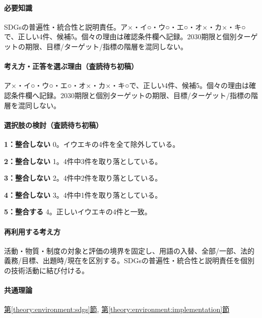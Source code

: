 \paragraph{必要知識} SDGsの普遍性・統合性と説明責任。ア×・イ○・ウ○・エ○・オ×・カ×・キ○で、正しい4件、候補5。個々の理由は確認条件欄へ記録。2030期限と個別ターゲットの期限、目標/ターゲット/指標の階層を混同しない。

\paragraph{考え方・正答を選ぶ理由（査読待ち初稿）} ア×・イ○・ウ○・エ○・オ×・カ×・キ○で、正しい4件、候補5。個々の理由は確認条件欄へ記録。2030期限と個別ターゲットの期限、目標/ターゲット/指標の階層を混同しない。

\paragraph{選択肢の検討（査読待ち初稿）}\mbox{}\par

\noindent\textbf{1：整合しない} 0。イウエキの4件を全て除外している。\par

\noindent\textbf{2：整合しない} 1。4件中3件を取り落としている。\par

\noindent\textbf{3：整合しない} 2。4件中2件を取り落としている。\par

\noindent\textbf{4：整合しない} 3。4件中1件を取り落としている。\par

\noindent\textbf{5：整合する} 4。正しいイウエキの4件と一致。\par

\paragraph{再利用する考え方} 活動・物質・制度の対象と評価の境界を固定し、用語の入替、全部/一部、法的義務/目標、出題時/現在を区別する。SDGsの普遍性・統合性と説明責任を個別の技術活動に結び付ける。

\paragraph{共通理論} \hyperref[theory:environment:sdgs]{第\ref*{theory:environment:sdgs}節}, \hyperref[theory:environment:implementation]{第\ref*{theory:environment:implementation}節}

